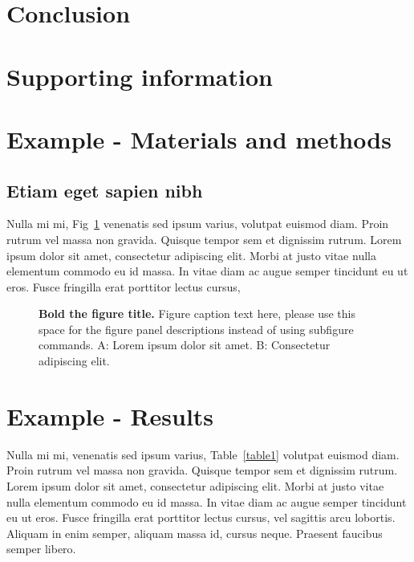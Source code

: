 \documentclass[10pt,letterpaper]{article}
\begin{document}
\section*{Conclusion}

\section*{Supporting information}




\section*{Example - Materials and methods}
\subsection*{Etiam eget sapien nibh}

Nulla mi mi, Fig~\ref{fig1} venenatis sed ipsum varius, volutpat euismod diam. Proin rutrum vel massa non gravida. Quisque tempor sem et dignissim rutrum. Lorem ipsum dolor sit amet, consectetur adipiscing elit. Morbi at justo vitae nulla elementum commodo eu id massa. In vitae diam ac augue semper tincidunt eu ut eros. Fusce fringilla erat porttitor lectus cursus, %

\begin{figure}[!h]
\caption{{\bf Bold the figure title.}
Figure caption text here, please use this space for the figure panel descriptions instead of using subfigure commands. A: Lorem ipsum dolor sit amet. B: Consectetur adipiscing elit.}
\label{fig1}
\end{figure}

\section*{Example - Results}
Nulla mi mi, venenatis sed ipsum varius, Table~\ref{table1} volutpat euismod diam. Proin rutrum vel massa non gravida. Quisque tempor sem et dignissim rutrum. Lorem ipsum dolor sit amet, consectetur adipiscing elit. Morbi at justo vitae nulla elementum commodo eu id massa. In vitae diam ac augue semper tincidunt eu ut eros. Fusce fringilla erat porttitor lectus cursus, vel sagittis arcu lobortis. Aliquam in enim semper, aliquam massa id, cursus neque. Praesent faucibus semper libero.
\end{document}
